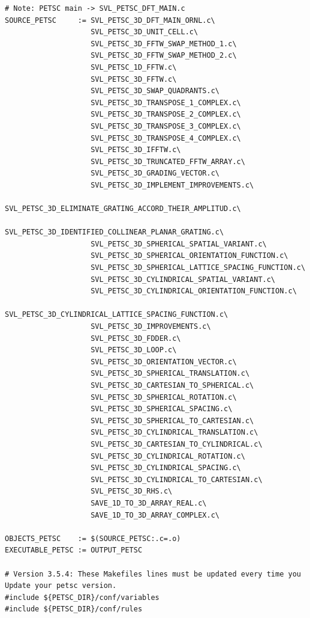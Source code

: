 \documentclass{article}
\begin{document}
\begin{itemize}
\begin{verbatim}
# Note: PETSC main -> SVL_PETSC_DFT_MAIN.c
SOURCE_PETSC     := SVL_PETSC_3D_DFT_MAIN_ORNL.c\
                    SVL_PETSC_3D_UNIT_CELL.c\
                    SVL_PETSC_3D_FFTW_SWAP_METHOD_1.c\
                    SVL_PETSC_3D_FFTW_SWAP_METHOD_2.c\
                    SVL_PETSC_1D_FFTW.c\
                    SVL_PETSC_3D_FFTW.c\
                    SVL_PETSC_3D_SWAP_QUADRANTS.c\
                    SVL_PETSC_3D_TRANSPOSE_1_COMPLEX.c\
                    SVL_PETSC_3D_TRANSPOSE_2_COMPLEX.c\
                    SVL_PETSC_3D_TRANSPOSE_3_COMPLEX.c\
                    SVL_PETSC_3D_TRANSPOSE_4_COMPLEX.c\
                    SVL_PETSC_3D_IFFTW.c\
                    SVL_PETSC_3D_TRUNCATED_FFTW_ARRAY.c\
                    SVL_PETSC_3D_GRADING_VECTOR.c\
                    SVL_PETSC_3D_IMPLEMENT_IMPROVEMENTS.c\
                    SVL_PETSC_3D_ELIMINATE_GRATING_ACCORD_THEIR_AMPLITUD.c\
                    SVL_PETSC_3D_IDENTIFIED_COLLINEAR_PLANAR_GRATING.c\
                    SVL_PETSC_3D_SPHERICAL_SPATIAL_VARIANT.c\
                    SVL_PETSC_3D_SPHERICAL_ORIENTATION_FUNCTION.c\
                    SVL_PETSC_3D_SPHERICAL_LATTICE_SPACING_FUNCTION.c\
                    SVL_PETSC_3D_CYLINDRICAL_SPATIAL_VARIANT.c\
                    SVL_PETSC_3D_CYLINDRICAL_ORIENTATION_FUNCTION.c\
                    SVL_PETSC_3D_CYLINDRICAL_LATTICE_SPACING_FUNCTION.c\
                    SVL_PETSC_3D_IMPROVEMENTS.c\
                    SVL_PETSC_3D_FDDER.c\
                    SVL_PETSC_3D_LOOP.c\
                    SVL_PETSC_3D_ORIENTATION_VECTOR.c\
                    SVL_PETSC_3D_SPHERICAL_TRANSLATION.c\
                    SVL_PETSC_3D_CARTESIAN_TO_SPHERICAL.c\
                    SVL_PETSC_3D_SPHERICAL_ROTATION.c\
                    SVL_PETSC_3D_SPHERICAL_SPACING.c\
                    SVL_PETSC_3D_SPHERICAL_TO_CARTESIAN.c\
                    SVL_PETSC_3D_CYLINDRICAL_TRANSLATION.c\
                    SVL_PETSC_3D_CARTESIAN_TO_CYLINDRICAL.c\
                    SVL_PETSC_3D_CYLINDRICAL_ROTATION.c\
                    SVL_PETSC_3D_CYLINDRICAL_SPACING.c\
                    SVL_PETSC_3D_CYLINDRICAL_TO_CARTESIAN.c\
                    SVL_PETSC_3D_RHS.c\
                    SAVE_1D_TO_3D_ARRAY_REAL.c\
                    SAVE_1D_TO_3D_ARRAY_COMPLEX.c\
                                        
OBJECTS_PETSC    := $(SOURCE_PETSC:.c=.o)
EXECUTABLE_PETSC := OUTPUT_PETSC

# Version 3.5.4: These Makefiles lines must be updated every time you Update your petsc version.
#include ${PETSC_DIR}/conf/variables
#include ${PETSC_DIR}/conf/rules


\end{verbatim}
\end{itemize}
\end{document}
